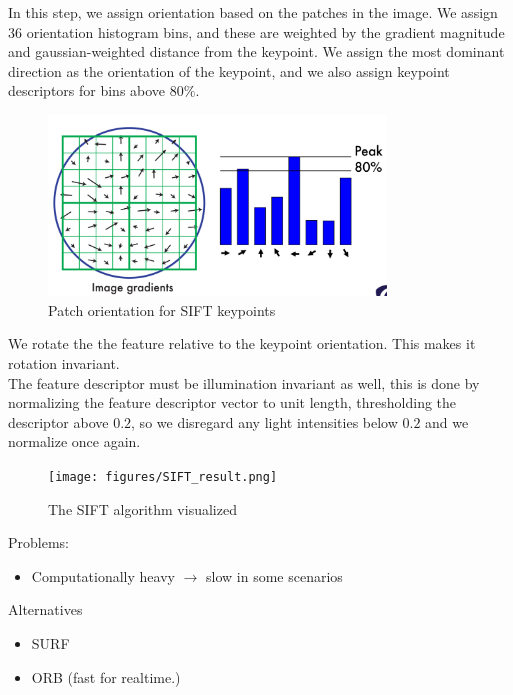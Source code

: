 \documentclass[a4paper]{article}
\begin{document}
In this step, we assign orientation based on the patches in the image. We assign 36 orientation histogram bins, and these are weighted by the gradient magnitude and gaussian-weighted distance from the keypoint. We assign the most dominant direction as the orientation of the keypoint, and we also assign keypoint descriptors for bins above $ 80\% $.
\begin{figure}[H]
\centering
\includegraphics[width=0.8\textwidth]{figures/SIFT_patch_orientation.png}
\caption{Patch orientation for SIFT keypoints}
\label{fig:Patch_orientation}
\end{figure} 


We rotate the the feature relative to the keypoint orientation.
This makes it rotation invariant. \\
The feature descriptor must be illumination invariant as well, this is done by normalizing the feature descriptor vector to unit length, thresholding the descriptor above $ 0.2 $, so we disregard any light intensities below  $ 0.2 $ and we normalize once again. 

\begin{figure}[H]
\centering
\texttt{[image: figures/SIFT\_result.png]}
\caption{The SIFT algorithm visualized}
\label{fig:SIFT_result}
\end{figure} 

Problems:
\begin{itemize}
	\item Computationally heavy $ \rightarrow $ slow in some scenarios
\end{itemize}
Alternatives
\begin{itemize}
	\item SURF
	\item ORB (fast for realtime.)
\end{itemize}



\newpage
\end{document}
